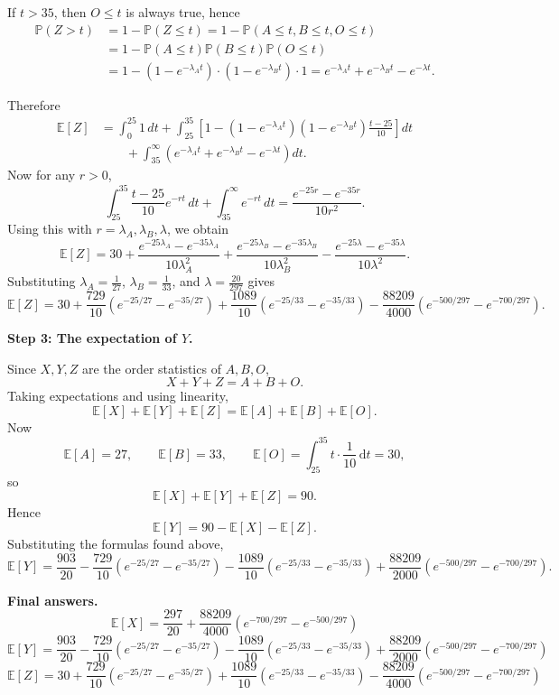 \documentclass[a4paper,12pt]{article}
\begin{document}
If $t > 35$, then $O\le t$ is always true, hence
\begin{align*}
    \mathbb P(Z>t) &= 1 - \mathbb{P} (Z \le t) = 1 - \mathbb{P} (A \le t, B \le t, O \le t)\\ 
    &= 1 - \mathbb{P} (A \le t) \mathbb{P} (B \le t) \mathbb{P} (O \le t) \\
    &= 1-(1-e^{-\lambda_A t}) \cdot (1-e^{-\lambda_B t}) \cdot 1 = e^{-\lambda_A t}+e^{-\lambda_B t}-e^{-\lambda t}.
\end{align*}

Therefore
\begin{align*}
\mathbb E[Z]
&=
\int_0^{25}1\,dt
+\int_{25}^{35}\left[1-(1-e^{-\lambda_A t})(1-e^{-\lambda_B t})\frac{t-25}{10}\right]dt \\
&\qquad
+\int_{35}^{\infty}\left(e^{-\lambda_A t}+e^{-\lambda_B t}-e^{-\lambda t}\right)dt.
\end{align*}
Now for any $r>0$,
\[
\int_{25}^{35}\frac{t-25}{10}e^{-rt}\,dt+\int_{35}^{\infty}e^{-rt}\,dt
=
\frac{e^{-25r}-e^{-35r}}{10r^2}.
\]
Using this with $r=\lambda_A,\lambda_B,\lambda$, we obtain
\[
\mathbb E[Z]
=
30
+
\frac{e^{-25\lambda_A}-e^{-35\lambda_A}}{10\lambda_A^2}
+
\frac{e^{-25\lambda_B}-e^{-35\lambda_B}}{10\lambda_B^2}
-
\frac{e^{-25\lambda}-e^{-35\lambda}}{10\lambda^2}.
\]
Substituting $\lambda_A=\frac1{27}$, $\lambda_B=\frac1{33}$, and $\lambda=\frac{20}{297}$ gives
\[
\mathbb E[Z]
=
30
+
\frac{729}{10}\left(e^{-25/27}-e^{-35/27}\right)
+
\frac{1089}{10}\left(e^{-25/33}-e^{-35/33}\right)
-
\frac{88209}{4000}\left(e^{-500/297}-e^{-700/297}\right).
\]

\medskip

\noindent\textbf{Step 3: The expectation of $Y$.}

Since $X,Y,Z$ are the order statistics of $A,B,O$,
\[
X+Y+Z=A+B+O.
\]
Taking expectations and using linearity,
\[
\mathbb E[X]+\mathbb E[Y]+\mathbb E[Z]
=
\mathbb E[A]+\mathbb E[B]+\mathbb E[O].
\]
Now
\[
\mathbb E[A]=27,\qquad \mathbb E[B]=33,\qquad \mathbb E[O]= \int _{25}^{35} t \cdot \frac{1}{10} \, \mathrm{d} t = 30,
\]
so
\[
\mathbb E[X]+\mathbb E[Y]+\mathbb E[Z]=90.
\]
Hence
\[
\mathbb E[Y]=90-\mathbb E[X]-\mathbb E[Z].
\]
Substituting the formulas found above,
\[
\mathbb E[Y]
=
\frac{903}{20}
-
\frac{729}{10}\left(e^{-25/27}-e^{-35/27}\right)
-
\frac{1089}{10}\left(e^{-25/33}-e^{-35/33}\right)
+
\frac{88209}{2000}\left(e^{-500/297}-e^{-700/297}\right).
\]

\medskip

\noindent\textbf{Final answers.}
\[
\boxed{
\mathbb E[X]
=
\frac{297}{20}
+
\frac{88209}{4000}
\left(
e^{-700/297}-e^{-500/297}
\right)
}
\]
\[
\boxed{
\mathbb E[Y]
=
\frac{903}{20}
-
\frac{729}{10}\left(e^{-25/27}-e^{-35/27}\right)
-
\frac{1089}{10}\left(e^{-25/33}-e^{-35/33}\right)
+
\frac{88209}{2000}\left(e^{-500/297}-e^{-700/297}\right)
}
\]
\[
\boxed{
\mathbb E[Z]
=
30
+
\frac{729}{10}\left(e^{-25/27}-e^{-35/27}\right)
+
\frac{1089}{10}\left(e^{-25/33}-e^{-35/33}\right)
-
\frac{88209}{4000}\left(e^{-500/297}-e^{-700/297}\right)
}
\]
\end{document}

